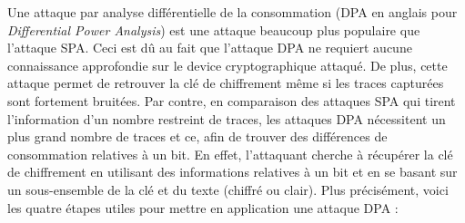 \documentclass[oneside]{book}
\begin{document}
Une attaque par analyse différentielle de la consommation (DPA en anglais pour \textit{Differential Power Analysis}) est une attaque beaucoup plus populaire que l'attaque SPA. Ceci est dû au fait que l'attaque DPA ne requiert aucune connaissance approfondie sur le device cryptographique attaqué. De plus, cette attaque permet de retrouver la clé de chiffrement même si les traces capturées sont fortement bruitées. Par contre, en comparaison des attaques SPA qui tirent l'information d'un nombre restreint de traces, les attaques DPA nécessitent un plus grand nombre de traces et ce, afin de trouver des différences de consommation relatives à un bit. En effet, l’attaquant cherche à récupérer la clé de chiffrement en utilisant des informations relatives à un bit et en se basant sur un sous-ensemble de la clé et du texte (chiffré ou clair). Plus précisément, voici les quatre étapes utiles pour mettre en application une attaque DPA : 
\end{document}
